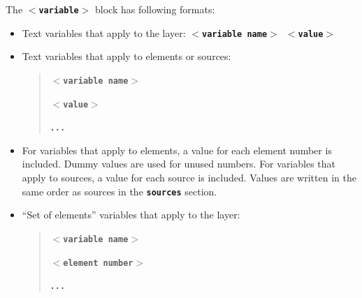 \documentclass[12pt]{report}
\begin{document}
The
\textbf{\texttt{\begin{math}<\end{math}variable\begin{math}>\end{math}}}
block has following formats:
\begin{itemize}
  \item Text variables that apply to the layer:
\textbf{\texttt{\begin{math}<\end{math}variable
name\begin{math}>\end{math}
\begin{math}<\end{math}value\begin{math}>\end{math}}}
  \item Text variables that apply to elements or sources:
\begin{quote}
\textbf{\texttt{\begin{math}<\end{math}variable
name\begin{math}>\end{math}}}

\textbf{\texttt{\begin{math}<\end{math}value\begin{math}>\end{math}}}

\textbf{\texttt{...}}
\end{quote}
  \item For variables that apply to elements, a value for each element number
is included. Dummy values are used for unused numbers. For variables
that apply to sources, a value for each source is included. Values are
written in the same order as sources in the \textbf{\texttt{sources}}
section.
  \item ``Set of elements'' variables that apply to the layer:
\begin{quote}
\textbf{\texttt{\begin{math}<\end{math}variable
name\begin{math}>\end{math}}}

\textbf{\texttt{\begin{math}<\end{math}element
number\begin{math}>\end{math}}}

\textbf{\texttt{...}}
\end{quote}
\end{itemize}
\end{document}
